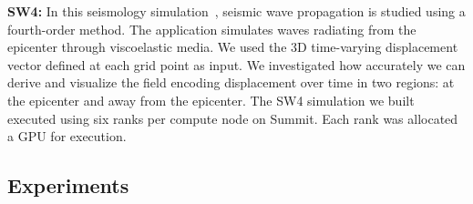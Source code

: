 \noindent\textbf{SW4:} In this seismology simulation~\cite{petersson2015wave}, seismic wave propagation is studied using a fourth-order method.
%
The application simulates waves radiating from the epicenter through viscoelastic media. 
%
%
We 
used the 3D time-varying displacement vector defined at each grid point as input.
%
We investigated how accurately we can derive and visualize the field encoding displacement over time in two regions: at the epicenter and away from the epicenter.
%
The SW4 simulation we built executed using six ranks per compute node on Summit. Each rank was allocated a GPU for execution.
%
%

%

%
\vspace{-1mm}
\subsection{Experiments}
\label{sec:experiments}

